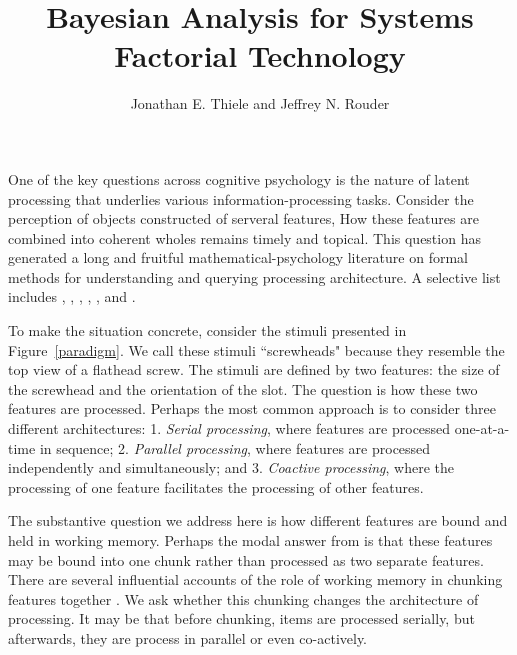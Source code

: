 \documentclass[fignum,nobf,man]{apa}
\author{Jonathan E. Thiele and Jeffrey N. Rouder}
\title{Bayesian Analysis for Systems Factorial Technology}
\affiliation{University of Missouri}
\begin{document}
\maketitle

One of the key questions across cognitive psychology is the nature of latent processing that underlies various information-processing tasks.  Consider the perception of objects constructed of serveral features,  How these features are combined into coherent wholes remains timely and topical.  This question has generated a long and fruitful
mathematical-psychology literature on formal methods for understanding and querying processing architecture.  A selective list
includes \citet{Garner:Felfoldy:1970}, \citet{Liu:1996}, \citet{Schweikert:Townsend:1989}, \citet{Sternberg:1969}, \citet{Townsend:1990}, and \citet{Townsend:Ashby:1982}.   

\nocite{Townsend:Nozawa:1995}

To make the situation concrete, consider the stimuli presented in Figure~\ref{paradigm}.  We call these stimuli ``screwheads" because they resemble the top view of a flathead screw.  The stimuli are defined by two features: the size of the screwhead and the orientation of the slot.  The question is how these two features are processed. Perhaps the most common approach is to consider three different architectures:   1. {\em Serial processing}, where features are processed one-at-a-time in sequence; 2. {\em  Parallel processing}, where features are processed independently and simultaneously; and 3. {\em Coactive processing}, where the processing of one feature facilitates the processing of other features. 

The substantive question we address here is how different features are bound and held in working memory.  Perhaps the modal answer from \citet{Miller:1956} is that these features may be bound into one chunk rather than processed as two separate features.  There are several influential accounts of the role of working memory in chunking features together \citep{Atkinson:Shiffrin:1968,Cowan:1995,Mandler:1980}.  We ask whether this chunking changes the architecture of processing.  It may be that before chunking, items are processed serially, but afterwards, they are process in parallel or even co-actively.  
\end{document}
